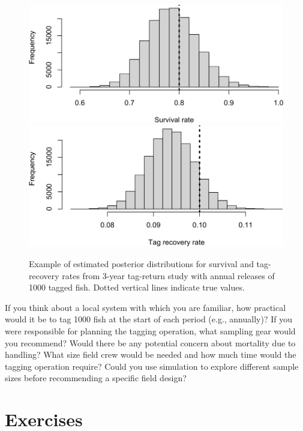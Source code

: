 \documentclass[
]{krantz}
\begin{document}
\begin{figure}
\includegraphics[width=0.9\linewidth]{bookdown_files/figure-latex/TagRetPlot-1} \includegraphics[width=0.9\linewidth]{bookdown_files/figure-latex/TagRetPlot-2} \caption{Example of estimated posterior distributions for survival and tag-recovery rates from 3-year tag-return study with annual releases of 1000 tagged fish. Dotted vertical lines indicate true values.}\label{fig:TagRetPlot}
\end{figure}

If you think about a local system with which you are familiar, how practical would it be to tag 1000 fish at the start of each period (e.g., annually)? If you were responsible for planning the tagging operation, what sampling gear would you recommend? Would there be any potential concern about mortality due to handling? What size field crew would be needed and how much time would the tagging operation require? Could you use simulation to explore different sample sizes before recommending a specific field design?

\hypertarget{exercises-3}{%
\section{Exercises}\label{exercises-3}}
\end{document}
